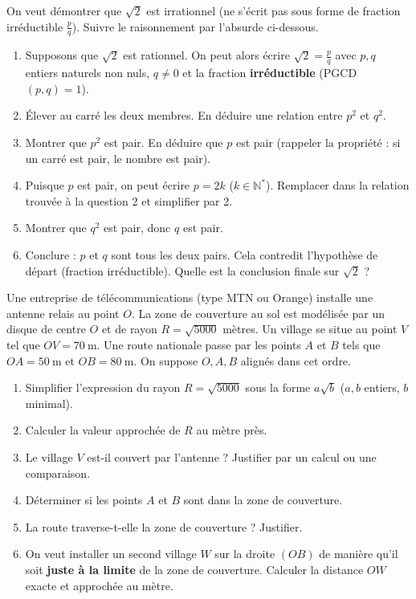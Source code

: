 \documentclass[11pt]{article}
\begin{document}
\begin{exercice}
On veut démontrer que $\sqrt{2}$ est irrationnel (ne s'écrit pas sous forme de fraction irréductible $\frac{p}{q}$).
Suivre le raisonnement par l'absurde ci-dessous.
\begin{enumerate}
    \item Supposons que $\sqrt{2}$ est rationnel. On peut alors écrire $\sqrt{2} = \frac{p}{q}$ avec $p,q$ entiers naturels non nuls, $q \neq 0$ et la fraction \textbf{irréductible} (PGCD$(p,q)=1$).
    \item Élever au carré les deux membres. En déduire une relation entre $p^2$ et $q^2$.
    \item Montrer que $p^2$ est pair. En déduire que $p$ est pair (rappeler la propriété : si un carré est pair, le nombre est pair).
    \item Puisque $p$ est pair, on peut écrire $p = 2k$ ($k \in \mathbb{N}^*$). Remplacer dans la relation trouvée à la question 2 et simplifier par 2.
    \item Montrer que $q^2$ est pair, donc $q$ est pair.
    \item Conclure : $p$ et $q$ sont tous les deux pairs. Cela contredit l'hypothèse de départ (fraction irréductible). Quelle est la conclusion finale sur $\sqrt{2}$ ?
\end{enumerate}
\end{exercice}

\begin{exercice}
Une entreprise de télécommunications (type MTN ou Orange) installe une antenne relais au point $O$. La zone de couverture au sol est modélisée par un disque de centre $O$ et de rayon $R = \sqrt{5000}$ mètres.
Un village se situe au point $V$ tel que $OV = 70~\text{m}$.
Une route nationale passe par les points $A$ et $B$ tels que $OA = 50~\text{m}$ et $OB = 80~\text{m}$. On suppose $O, A, B$ alignés dans cet ordre.
\begin{enumerate}
    \item Simplifier l'expression du rayon $R = \sqrt{5000}$ sous la forme $a\sqrt{b}$ ($a,b$ entiers, $b$ minimal).
    \item Calculer la valeur approchée de $R$ au mètre près.
    \item Le village $V$ est-il couvert par l'antenne ? Justifier par un calcul ou une comparaison.
    \item Déterminer si les points $A$ et $B$ sont dans la zone de couverture.
    \item La route traverse-t-elle la zone de couverture ? Justifier.
    \item On veut installer un second village $W$ sur la droite $(OB)$ de manière qu'il soit \textbf{juste à la limite} de la zone de couverture. Calculer la distance $OW$ exacte et approchée au mètre.
\end{enumerate}
\end{exercice}
\end{document}
